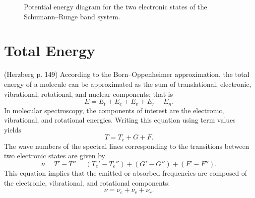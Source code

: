 \documentclass[11pt, twoside, fleqn]{report}
\newcommand{\state}[2]{\prescript{#1}{}{#2}}
\begin{document}
\begin{figure}[H]
        \caption{Potential energy diagram for the two electronic states of the Schumann--Runge band system.}
    \end{figure}

    \section{Total Energy}

    (Herzberg p. 149)
    According to the Born--Oppenheimer approximation, the total energy of a molecule can be approximated as the sum of translational, electronic, vibrational, rotational, and nuclear components; that is
    \begin{equation*}
        E = E_{t} + E_{e} + E_{v} + E_{r} + E_{n}.
    \end{equation*}
    In molecular spectroscopy, the components of interest are the electronic, vibrational, and rotational energies. Writing this equation using term values yields
    \begin{equation*}
        T = T_{e} + G + F.
    \end{equation*}
    The wave numbers of the spectral lines corresponding to the transitions between two electronic states are given by
    \begin{equation*}
        \nu = T' - T'' = (T_{e}' - T_{e}'') + (G' - G'') + (F' - F'').
    \end{equation*}
    This equation implies that the emitted or absorbed frequencies are composed of the electronic, vibrational, and rotational components:
    \begin{equation*}
        \nu = \nu_{e} + \nu_{v} + \nu_{r}.
    \end{equation*}
\end{document}
